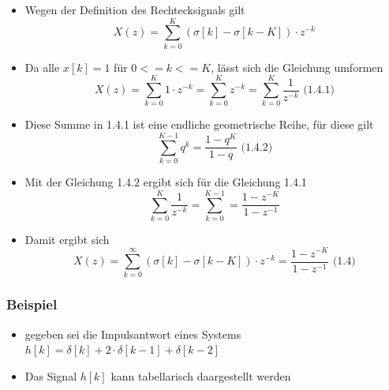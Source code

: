 \documentclass[11pt]{article}
\providecommand{\tightlist}{%
      \setlength{\itemsep}{0pt}\setlength{\parskip}{0pt}}
\begin{document}
    \begin{itemize}
\tightlist
\item
  Wegen der Definition des Rechtecksignals gilt
  \[X(z) = \sum_{k=0}^K (\sigma[k] - \sigma[k-K]) \cdot z^{-k}\]
\end{itemize}

    \begin{itemize}
\tightlist
\item
  Da alle \(x[k] = 1\) für \(0 <= k <= K\), lässt sich die Gleichung
  umformen
  \[X(z) = \sum_{k=0}^K 1 \cdot z^{-k} = \sum_{k=0}^K z^{-k} = \sum_{k=0}^K \frac{1}{z^{-k}}\textrm{  (1.4.1)}\]
\end{itemize}

    \begin{itemize}
\tightlist
\item
  Diese Summe in 1.4.1 ist eine endliche geometrische Reihe, für diese
  gilt \[\sum_{k=0}^{K-1} q^k = \frac{1-q^K}{1-q}\textrm{  (1.4.2)}\]
\end{itemize}

    \begin{itemize}
\tightlist
\item
  Mit der Gleichung 1.4.2 ergibt sich für die Gleichung 1.4.1
  \[\sum_{k=0}^K \frac{1}{z^{-k}} = \sum_{k=0}^{K-1} = \frac{1-z^{-K}}{1-z^{-1}}\]
\end{itemize}

    \begin{itemize}
\tightlist
\item
  Damit ergibt sich
  \[X(z) = \sum_{k=0}^\infty (\sigma[k] - \sigma[k-K]) \cdot z^{-k} = \frac{1-z^{-K}}{1-z^{-1}} \textrm{  (1.4)}\]
\end{itemize}

    \subsubsection{Beispiel}\label{beispiel}

\begin{itemize}
\tightlist
\item
  gegeben sei die Impulsantwort eines Systems
  \(h[k] = \delta[k] + 2 \cdot \delta[k-1] + \delta[k-2]\)
\end{itemize}

    \begin{itemize}
\tightlist
\item
  Das Signal \(h[k]\) kann tabellarisch daargestellt werden
\end{itemize}
\end{document}

